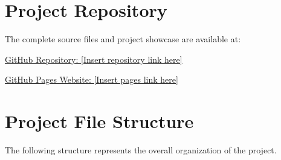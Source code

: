 \documentclass[12pt,a4paper]{report}
\begin{document}
\chapter*{Project Repository}
{}

The complete source files and project showcase are available at:

\noindent\href{https://github.com/}{GitHub Repository: [Insert repository link here]}

\noindent\href{https://github.com/}{GitHub Pages Website: [Insert pages link here]}

\chapter*{Project File Structure}
{}

The following structure represents the overall organization of the project.
\end{document}
